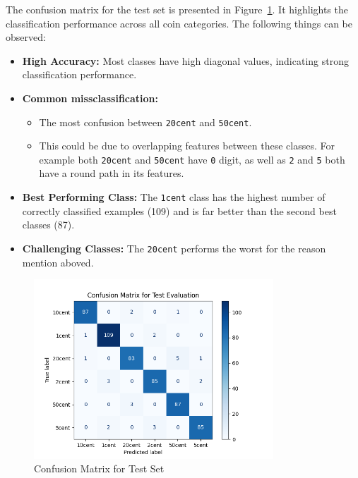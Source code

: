 \documentclass[a4paper,12pt]{article}
\begin{document}
The confusion matrix for the test set is presented in Figure~\ref{fig:confusion}. It highlights the classification performance across all coin categories. The following things can be observed:

\begin{itemize}
    \item \textbf{High Accuracy:} Most classes have  high diagonal values, indicating strong classification performance.
    \item \textbf{Common missclassification:}
    \begin{itemize}
        \item The most confusion between \texttt{20cent} and \texttt{50cent}.
        \item This could be due to overlapping features between these classes. For example both \texttt{20cent} and \texttt{50cent} have \texttt{0} digit, as well as \texttt{2} and \texttt{5} both have a round path in its features.
    \end{itemize}
    \item \textbf{Best Performing Class:} The \texttt{1cent} class has the highest number of correctly classified examples (109) and is far better than the second best classes (87).
    \item \textbf{Challenging Classes:} The \texttt{20cent} performs the worst for the reason mention aboved.
\end{itemize}

\begin{figure}[h!]
    \centering
    \includegraphics[width=0.8\textwidth]{confusion_matrix.png}
    \caption{Confusion Matrix for Test Set}
    \label{fig:confusion}
\end{figure}
\end{document}
